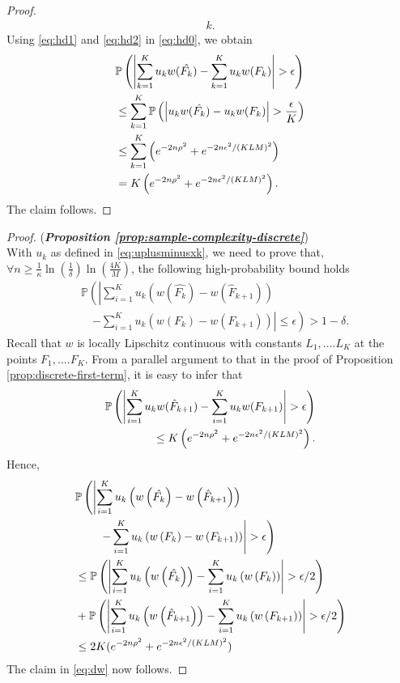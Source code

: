 \begin{proof}
\begin{align}
    k.\label{eq:hd2}
\end{align}
Using \eqref{eq:hd1} and \eqref{eq:hd2} in \eqref{eq:hd0}, we obtain
\begin{align*}
& \mathbb{P}\left( \left| \sum_{k=1}^K u_k w(\hat{F_k}) - \sum_{k=1}^K u_k w(F_k) \right| >\epsilon \right)\\
 & \leq
\sum_{k=1}^K \mathbb{P}\left( \left| u_k w(\hat{F_k}) -u_k w(F_k) \right| > \frac {\epsilon} {K} \right) \\ 
& \le \sum_{k=1}^K \left( e^{-2n\rho^2} + e^{-2n\epsilon^2  / (KLM)^2} \right) \\ 
& =K    \left(e^{-2n\rho^2} + e^{-2n\epsilon^2 / (KLM)^2}\right).
\end{align*}
The claim follows.
\end{proof}

\begin{proof}(\textbf{\textit{Proposition \ref{prop:sample-complexity-discrete}}})\ \\
With $u_k$ as defined in \eqref{eq:uplusminusxk}, we need to prove that, $\forall n \ge \frac{1}{\kappa}\ln\!\left(\frac{1}{\delta}\right) \ln\left(\frac{4K}{M}\right)\!$, the following high-probability bound holds
\begin{align}
&\mathbb{P}\left(\left|\sum_{i=1}^K u_{k} \left(w\left(\hat{F_k}\right)- w\left(\hat F_{k+1}\right) \right)\right.\right.\nonumber\\
&\quad\left.\left.-  
\sum_{i=1}^K u_{k} \left(w\left(F_k\right)- w\left(F_{k+1}\right) \right)
\right| \leq \epsilon\right) > 1-\delta.
\label{eq:dw}
\end{align}
Recall that $w$ is locally Lipschitz continuous with constants $L_1,....L_K$ at the points $F_1,....F_K$.
From a parallel argument to that in the proof of Proposition \ref{prop:discrete-first-term}, it is easy to infer that
\begin{align*}
\mathbb{P}\left( \left| \sum_{i=1}^K u_k w(\hat F_{k+1}) - \sum_{i=1}^K u_k w(F_{k+1}) \right| >\epsilon \right)\\
\le
K \left( e^{-2n\rho^2 } + e^{-2n\epsilon^2 /(KLM)^2}\right).
\end{align*}
Hence,
\begin{align*}
& \mathbb{P}\left(\left|\sum_{i=1}^K u_k \left(w\left(\hat{F_k}\right)- w\left(\hat F_{k+1}\right) \right)\right.\right.\\
&\qquad\left.\left. -  \sum_{i=1}^K u_k \left(w\left(F_k\right)-
w\left(F_{k+1}\right) \right) \right| > \epsilon\right) \\ 
&\leq  \mathbb{P}\left( \left|\sum_{i=1}^K u_k \left(w\left(\hat{F_k}\right)\right) -
    \sum_{i=1}^K u_k \left(w\left(F_k\right)\right) \right| > \epsilon/2 \right) \\
		&+ \mathbb{P}\left( \left|\sum_{i=1}^K u_k
    \left(w\left(\hat F_{k+1}\right)\right) -  \sum_{i=1}^K u_k \left(w\left(F_{k+1}\right)\right) \right| > \epsilon/2 \right) \\ 
		&\leq  2K
    (e^{-2n\rho^2} + e^{-2n\epsilon^2/(KLM)^2})
\end{align*}
The claim in \eqref{eq:dw} now follows.
\end{proof}
